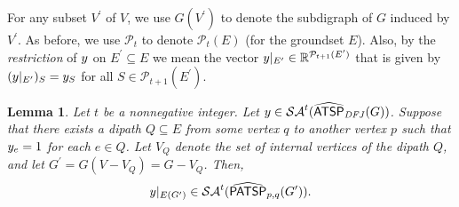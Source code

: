 \documentclass[11pt]{article}
\newtheorem{lemma}[theorem]{Lemma}
\newcommand{\pop}{\mathcal{P}}
\newcommand \reals {\mathbb{R}}
\newcommand{\atspdfjpolytope}{\widehat{\textsf{ATSP}}_{\mathit{DFJ}}}
\newcommand{\PATSPpolytope}{\widehat{\textsf{PATSP}}}
\newcommand{\saop}{\mathcal{SA}}
\newcommand{\homog}[1]{{#1}}
\begin{document}
For any subset $V^{\prime}$ of $V$, we use $G(V^{\prime})$ to denote
the subdigraph of $G$ induced by $V^{\prime}$. As before, we use $\pop_t$ to denote $\pop_t(E)$ (for the groundset $E$). Also, by the \emph{restriction} of $y$ on $E^{\prime}\subseteq E$ we mean the vector
$\zveconly|_{E^{\prime}}\in \reals^{\pop_{t+1}(E^{\prime})}$ that
is given by
$(y|_{E^{\prime}})_S=y_S$
for all $S \in \pop_{t+1}(E^{\prime})$.



\begin{lemma}
\label{reduction}
Let $t$ be a nonnegative integer.
Let $\zveconly\in \saop^t(\homog{\atspdfjpolytope(G)})$.
Suppose that there exists a dipath $Q\subseteq E$
from some vertex $q$ to another vertex $p$
such that
$y_e=1$ for each $e\in Q$.
Let $V_Q$ denote the set of internal vertices of the dipath $Q$, and
let $G^{\prime} = G(V - V_Q) = G - V_Q$.
Then,
\[
\zveconly|_{E(G^{\prime})}\in \saop^t(\homog {\PATSPpolytope_{p,q}(G^{\prime})}).
\]
\end{lemma}
\end{document}
